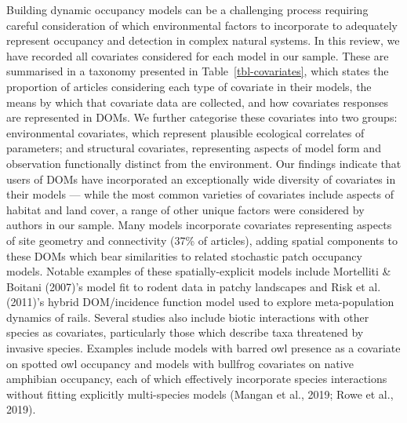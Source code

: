 \documentclass[
]{article}
\begin{document}
Building dynamic occupancy models can be a challenging process requiring
careful consideration of which environmental factors to incorporate to
adequately represent occupancy and detection in complex natural systems.
In this review, we have recorded all covariates considered for each
model in our sample. These are summarised in a taxonomy presented in
Table~\ref{tbl-covariates}, which states the proportion of articles
considering each type of covariate in their models, the means by which
that covariate data are collected, and how covariates responses are
represented in DOMs. We further categorise these covariates into two
groups: environmental covariates, which represent plausible ecological
correlates of parameters; and structural covariates, representing
aspects of model form and observation functionally distinct from the
environment. Our findings indicate that users of DOMs have incorporated
an exceptionally wide diversity of covariates in their models --- while
the most common varieties of covariates include aspects of habitat and
land cover, a range of other unique factors were considered by authors
in our sample. Many models incorporate covariates representing aspects
of site geometry and connectivity (37\% of articles), adding spatial
components to these DOMs which bear similarities to related stochastic
patch occupancy models. Notable examples of these spatially-explicit
models include Mortelliti \& Boitani (2007)'s model fit to rodent data
in patchy landscapes and Risk et al. (2011)'s hybrid DOM/incidence
function model used to explore meta-population dynamics of rails.
Several studies also include biotic interactions with other species as
covariates, particularly those which describe taxa threatened by
invasive species. Examples include models with barred owl presence as a
covariate on spotted owl occupancy and models with bullfrog covariates
on native amphibian occupancy, each of which effectively incorporate
species interactions without fitting explicitly multi-species models
(Mangan et al., 2019; Rowe et al., 2019).
\end{document}
